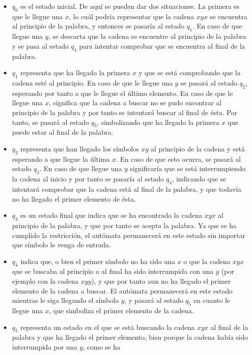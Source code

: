 \documentclass[11pt,a4paper]{article}
\begin{document}
		\begin{itemize}
			\item $q_0$ es el estado inicial. De aquí se pueden dar dos situaciones. La primera es que le llegue una
			$x$, lo cuál podría representar que la cadena $xyx$ se encuentra al principio de la palabra, y entonces
			se pasaría al estado $q_1$. En caso de que llegue una $y$, se descarta que la cadena se encuentre al
			principio de la palabra y se pasa al estado $q_4$ para intentar comprobar que se encuentra al final
			de la palabra.
			\item $q_1$ representa que ha llegado la primera $x$ y que se está comprobando que la cadena esté al
			principio. En caso de que le llegue una $y$ se pasará al estado $q_2$, esperando por tanto a que le llegue
			el último elemento. En caso de que le llegue una $x$, significa que la cadena a buscar no se pudo encontrar 
			al principio de la palabra y por tanto se intentará buscar al final de ésta. Por tanto, se pasará al estado
			$q_5$, simbolizando que ha llegado la primera $x$ que puede estar al final de la palabra.
			\item $q_2$ representa que han llegado los símbolos $xy$ al principio de la cadena y está esperando a que
			llegue la última $x$. En caso de que esto ocurra, se pasará al estado $q_3$. En caso de que llegue una $y$
			significaría que se está interrumpiendo la cadena al inicio y por tanto se pasaría al estado $q_4$,
			indicando que se intentará comprobar que la cadena está al final de la palabra, y que todavía no ha llegado
			el primer elemento de ésta.
			\item $q_3$ es un estado final que indica que se ha encontrado la cadena $xyx$ al principio de la palabra,
			y que por tanto se acepta la palabra. Ya que se ha cumplido la restricción, el autómata permanecerá en este
			estado sin importar que símbolo le venga de entrada.
			\item $q_4$ indica que, o bien el primer símbolo no ha sido una $x$ o que la cadena $xyx$ que se buscaba
			al principio o al final ha sido interrumpida con una $y$ (por ejemplo con la cadena $xyy$), y que por tanto 
			aun no ha llegado el primer elemento de la cadena a buscar. El autómata permanecerá en este estado mientras
			le siga llegando el símbolo $y$, y pasará al estado $q_5$ en cuanto le llegue una $x$, que simboliza el
			primer 	elemento de la cadena.
			\item $q_5$ representa un estado en el que se está buscando la cadena $xyx$ al final de la palabra y que
			ha llegado el primer elemento, bien porque la cadena había sido interrumpida por una $y$, como se ha

\end{itemize}
\end{document}
